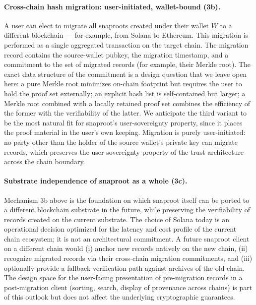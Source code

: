 \documentclass[11pt,a4paper]{article}
\begin{document}
\paragraph{Cross-chain hash migration: user-initiated, wallet-bound (3b).}
A user can elect to migrate all snaproots created under their wallet
$W$ to a different blockchain --- for example, from Solana to Ethereum.
This migration is performed as a single aggregated transaction on the
target chain. The migration record contains the source-wallet pubkey,
the migration timestamp, and a commitment to the set of migrated
records (for example, their Merkle root). The exact data structure of
the commitment is a design question that we leave open here: a pure
Merkle root minimizes on-chain footprint but requires the user to hold
the proof set externally; an explicit hash list is self-contained but
larger; a Merkle root combined with a locally retained proof set
combines the efficiency of the former with the verifiability of the
latter. We anticipate the third variant to be the most natural fit for
snaproot's user-sovereignty property, since it places the proof
material in the user's own keeping. Migration is purely user-initiated:
no party other than the holder of the source wallet's private key can
migrate records, which preserves the user-sovereignty property of the
trust architecture across the chain boundary.

\paragraph{Substrate independence of snaproot as a whole (3c).}
Mechanism 3b above is the foundation on which snaproot itself can be
ported to a different blockchain substrate in the future, while
preserving the verifiability of records created on the current
substrate. The choice of Solana today is an operational decision
optimized for the latency and cost profile of the current chain
ecosystem; it is not an architectural commitment. A future snaproot
client on a different chain would (i) anchor new records natively on
the new chain, (ii) recognize migrated records via their cross-chain
migration commitments, and (iii) optionally provide a fallback
verification path against archives of the old chain. The design space
for the user-facing presentation of pre-migration records in a
post-migration client (sorting, search, display of provenance across
chains) is part of this outlook but does not affect the underlying
cryptographic guarantees.
\end{document}
